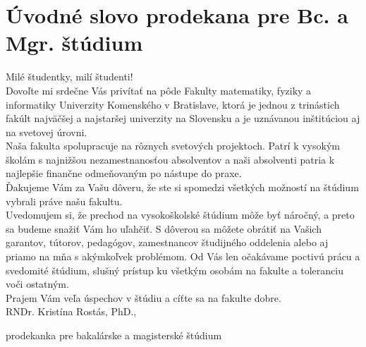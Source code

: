 \chapter{Úvodné slovo prodekana pre Bc. a Mgr. štúdium}

Milé študentky, milí študenti!\\

Dovoľte mi srdečne Vás privítať na pôde Fakulty matematiky, fyziky a informatiky Univerzity Komenského v Bratislave, ktorá je jednou z trinástich fakúlt najväčšej a najstaršej univerzity na Slovensku a je uznávanou inštitúciou aj na svetovej úrovni.\\

Naša fakulta spolupracuje na rôznych svetových projektoch. Patrí k vysokým školám s najnižšou nezamestnanosťou absolventov a naši absolventi patria k najlepšie finančne odmeňovaným po nástupe do praxe.\\

Ďakujeme Vám za Vašu dôveru, že ste si spomedzi všetkých možností na štúdium vybrali práve našu fakultu.\\

Uvedomujem si, že prechod na vysokoškolské štúdium môže byť náročný, a preto sa budeme snažiť Vám ho uľahčiť. S dôverou sa môžete obrátiť na Vašich garantov, tútorov, pedagógov, zamestnancov študijného oddelenia alebo aj priamo na mňa s akýmkoľvek problémom. Od Vás len očakávame poctivú prácu a svedomité štúdium, slušný prístup ku všetkým osobám na fakulte a toleranciu voči ostatným.\\

Prajem Vám veľa úspechov v štúdiu a cíťte sa na fakulte dobre.\\

RNDr. Kristína Rostás, PhD.,

prodekanka pre bakalárske a magisterské štúdium